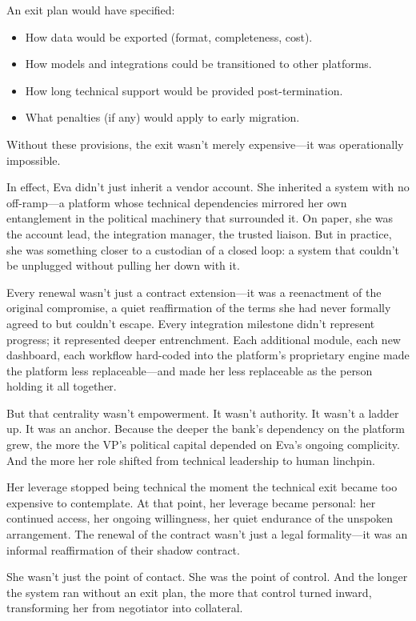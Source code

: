 An exit plan would have specified:  
\begin{itemize}
    \item How data would be exported (format, completeness, cost).
    \item How models and integrations could be transitioned to other platforms.
    \item How long technical support would be provided post-termination.
    \item What penalties (if any) would apply to early migration.
\end{itemize}

Without these provisions, the exit wasn’t merely expensive—it was operationally impossible.  

In effect, Eva didn’t just inherit a vendor account. She inherited a system with no off-ramp—a platform whose technical dependencies mirrored her own entanglement in the political machinery that surrounded it. On paper, she was the account lead, the integration manager, the trusted liaison. But in practice, she was something closer to a custodian of a closed loop: a system that couldn’t be unplugged without pulling her down with it.

Every renewal wasn’t just a contract extension—it was a reenactment of the original compromise, a quiet reaffirmation of the terms she had never formally agreed to but couldn’t escape. Every integration milestone didn’t represent progress; it represented deeper entrenchment. Each additional module, each new dashboard, each workflow hard-coded into the platform’s proprietary engine made the platform less replaceable—and made her less replaceable as the person holding it all together.

But that centrality wasn’t empowerment. It wasn’t authority. It wasn’t a ladder up. It was an anchor. Because the deeper the bank’s dependency on the platform grew, the more the VP’s political capital depended on Eva’s ongoing complicity. And the more her role shifted from technical leadership to human linchpin.

Her leverage stopped being technical the moment the technical exit became too expensive to contemplate. At that point, her leverage became personal: her continued access, her ongoing willingness, her quiet endurance of the unspoken arrangement. The renewal of the contract wasn’t just a legal formality—it was an informal reaffirmation of their shadow contract.

She wasn’t just the point of contact. She was the point of control. And the longer the system ran without an exit plan, the more that control turned inward, transforming her from negotiator into collateral.

